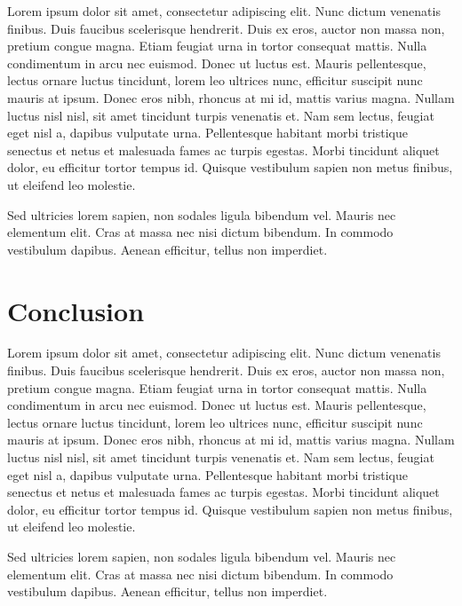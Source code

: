 \documentclass{article}
\begin{document}
		Lorem ipsum dolor sit amet, consectetur adipiscing elit. Nunc dictum venenatis finibus. Duis faucibus scelerisque hendrerit. Duis ex eros, auctor non massa non, pretium congue magna. Etiam feugiat urna in tortor consequat mattis. Nulla condimentum in arcu nec euismod. Donec ut luctus est. Mauris pellentesque, lectus ornare luctus tincidunt, lorem leo ultrices nunc, efficitur suscipit nunc mauris at ipsum. Donec eros nibh, rhoncus at mi id, mattis varius magna. Nullam luctus nisl nisl, sit amet tincidunt turpis venenatis et. Nam sem lectus, feugiat eget nisl a, dapibus vulputate urna. Pellentesque habitant morbi tristique senectus et netus et malesuada fames ac turpis egestas. Morbi tincidunt aliquet dolor, eu efficitur tortor tempus id. Quisque vestibulum sapien non metus finibus, ut eleifend leo molestie.

		Sed ultricies lorem sapien, non sodales ligula bibendum vel. Mauris nec elementum elit. Cras at massa nec nisi dictum bibendum. In commodo vestibulum dapibus. Aenean efficitur, tellus non imperdiet. 

\section{Conclusion}
  \label{sec:Conlusion}
  Lorem ipsum dolor sit amet, consectetur adipiscing elit. Nunc dictum venenatis finibus. Duis faucibus scelerisque hendrerit. Duis ex eros, auctor non massa non, pretium congue magna. Etiam feugiat urna in tortor consequat mattis. Nulla condimentum in arcu nec euismod. Donec ut luctus est. Mauris pellentesque, lectus ornare luctus tincidunt, lorem leo ultrices nunc, efficitur suscipit nunc mauris at ipsum. Donec eros nibh, rhoncus at mi id, mattis varius magna. Nullam luctus nisl nisl, sit amet tincidunt turpis venenatis et. Nam sem lectus, feugiat eget nisl a, dapibus vulputate urna. Pellentesque habitant morbi tristique senectus et netus et malesuada fames ac turpis egestas. Morbi tincidunt aliquet dolor, eu efficitur tortor tempus id. Quisque vestibulum sapien non metus finibus, ut eleifend leo molestie.

  Sed ultricies lorem sapien, non sodales ligula bibendum vel. Mauris nec elementum elit. Cras at massa nec nisi dictum bibendum. In commodo vestibulum dapibus. Aenean efficitur, tellus non imperdiet. 
  
\end{document}
